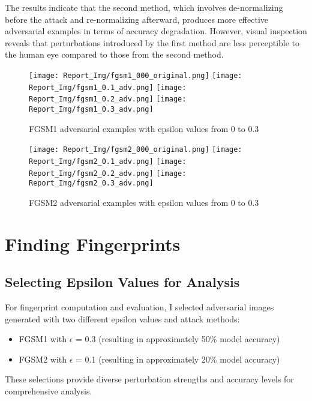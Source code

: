 \documentclass[a4paper,12pt]{report}%
\begin{document}
The results indicate that the second method, which involves de-normalizing before the attack and re-normalizing afterward, produces more effective adversarial examples in terms of accuracy degradation. However, visual inspection reveals that perturbations introduced by the first method are less perceptible to the human eye compared to those from the second method.
\begin{figure}[!htb]
\centering
{}
\texttt{[image: Report\_Img/fgsm1\_000\_original.png]}
\endminipage\hfill
{}
\texttt{[image: Report\_Img/fgsm1\_0.1\_adv.png]}
\endminipage\hfill
{}
\texttt{[image: Report\_Img/fgsm1\_0.2\_adv.png]}
\endminipage\hfill
{}%
\texttt{[image: Report\_Img/fgsm1\_0.3\_adv.png]}
\endminipage
\caption{FGSM1 adversarial examples with epsilon values from 0 to 0.3}
\label{fig:fgsm1_examples}
\end{figure}

\begin{figure}[!htb]
\centering
{}
\texttt{[image: Report\_Img/fgsm2\_000\_original.png]}
\endminipage\hfill
{}
\texttt{[image: Report\_Img/fgsm2\_0.1\_adv.png]}
\endminipage\hfill
{}
\texttt{[image: Report\_Img/fgsm2\_0.2\_adv.png]}
\endminipage\hfill
{}%
\texttt{[image: Report\_Img/fgsm2\_0.3\_adv.png]}
\endminipage
\caption{FGSM2 adversarial examples with epsilon values from 0 to 0.3}
\label{fig:fgsm2_examples}
\end{figure}

\newpage
\chapter{Finding Fingerprints}

\section{Selecting Epsilon Values for Analysis}
For fingerprint computation and evaluation, I selected adversarial images generated with two different epsilon values and attack methods:
\begin{itemize}
\item FGSM1 with $\epsilon$ = 0.3 (resulting in approximately 50\% model accuracy)
\item FGSM2 with $\epsilon$ = 0.1 (resulting in approximately 20\% model accuracy)
\end{itemize}
These selections provide diverse perturbation strengths and accuracy levels for comprehensive analysis.
\end{document}
